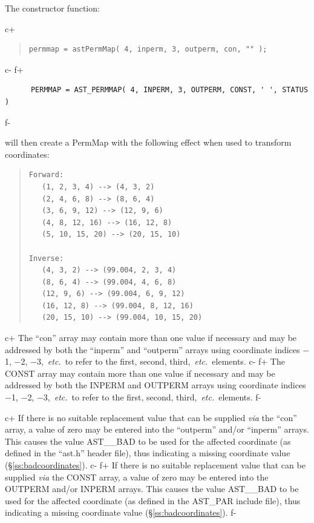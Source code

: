 \documentclass[twoside,11pt]{article}
\newcommand{\secref}[1]{\S\ref{#1}}
\newcommand{\secref}[1]{\ref{#1}}
\begin{document}
The constructor function:

c+
\begin{quote}
\small
\begin{verbatim}
permmap = astPermMap( 4, inperm, 3, outperm, con, "" );
\end{verbatim}
\normalsize
\end{quote}
c-
f+
\small
\begin{verbatim}
      PERMMAP = AST_PERMMAP( 4, INPERM, 3, OUTPERM, CONST, ' ', STATUS )
\end{verbatim}
\normalsize
f-

will then create a PermMap with the following effect when used to
transform coordinates:

\begin{quote}
\begin{verbatim}
Forward:
   (1, 2, 3, 4) --> (4, 3, 2)
   (2, 4, 6, 8) --> (8, 6, 4)
   (3, 6, 9, 12) --> (12, 9, 6)
   (4, 8, 12, 16) --> (16, 12, 8)
   (5, 10, 15, 20) --> (20, 15, 10)

Inverse:
   (4, 3, 2) --> (99.004, 2, 3, 4)
   (8, 6, 4) --> (99.004, 4, 6, 8)
   (12, 9, 6) --> (99.004, 6, 9, 12)
   (16, 12, 8) --> (99.004, 8, 12, 16)
   (20, 15, 10) --> (99.004, 10, 15, 20)
\end{verbatim}
\end{quote}

c+
The ``con'' array may contain more than one value if necessary and may
be addressed by both the ``inperm'' and ``outperm'' arrays using
coordinate indices $-$1, $-$2, $-$3,~{\em{etc.}}\ to refer to the
first, second, third,~{\em{etc.}}\ elements.
c-
f+
The CONST array may contain more than one value if necessary and may
be addressed by both the INPERM and OUTPERM arrays using coordinate
indices $-$1, $-$2, $-$3,~{\em{etc.}}\ to refer to the first, second,
third,~{\em{etc.}}\ elements.
f-

c+
If there is no suitable replacement value that can be supplied
{\em{via}} the ``con'' array, a value of zero may be entered into the
``outperm'' and/or ``inperm'' arrays. This causes the value AST\_\_BAD
to be used for the affected coordinate (as defined in the ``ast.h''
header file), thus indicating a missing coordinate value
(\secref{ss:badcoordinates}).
c-
f+
If there is no suitable replacement value that can be supplied
{\em{via}} the CONST array, a value of zero may be entered into the
OUTPERM and/or INPERM arrays. This causes the value AST\_\_BAD to be
used for the affected coordinate (as defined in the AST\_PAR include
file), thus indicating a missing coordinate value
(\secref{ss:badcoordinates}).
f-
\end{document}
